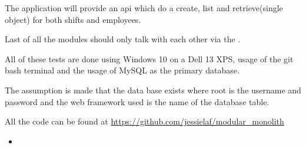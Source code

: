 The application will provide an api which do a create, list and retrieve(single object) for both shifts and employees. 

Last of all the modules should only talk with each other via the .

All of these tests are done using Windows 10 on a Dell 13 XPS, usage of the git bash terminal and the usage of MySQL as the primary database.

The assumption is made that the data base exists where root is the username and password and the web framework used is the name of the database table.

All the code can be found at \url{https://github.com/jessielaf/modular_monolith}

\begin{itemize}
    \item {}
\end{itemize}

